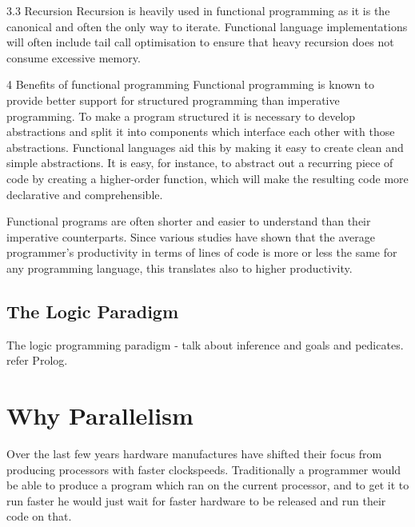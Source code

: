 \documentclass{report}
\begin{document}
3.3 Recursion
Recursion is heavily used in functional programming as it is the canonical and often the only way to iterate. Functional language implementations will often include tail call optimisation to ensure that heavy recursion does not consume excessive memory.

4 Benefits of functional programming
Functional programming is known to provide better support for structured programming than imperative programming. To make a program structured it is necessary to develop abstractions and split it into components which interface each other with those abstractions. Functional languages aid this by making it easy to create clean and simple abstractions. It is easy, for instance, to abstract out a recurring piece of code by creating a higher-order function, which will make the resulting code more declarative and comprehensible.

Functional programs are often shorter and easier to understand than their imperative counterparts. Since various studies have shown that the average programmer's productivity in terms of lines of code is more or less the same for any programming language, this translates also to higher productivity.


\subsection{The Logic Paradigm}
The logic programming paradigm - talk about inference and goals and pedicates. refer Prolog.

\section{Why Parallelism}
Over the last few years hardware manufactures have shifted their focus from producing processors with faster clockspeeds. Traditionally a programmer would be able to produce a program which ran on the current processor, and to get it to run faster he would just wait for faster hardware to be released and run their code on that.  
\end{document}
